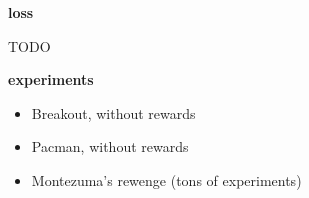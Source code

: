 \documentclass[xcolor=dvipsnames]{beamer}
\begin{document}
\begin{frame}{\bf loss}

TODO 

\end{frame}


\begin{frame}{\bf experiments}

  \begin{itemize}
    \item Breakout, without rewards
    \item Pacman, without rewards
    \item Montezuma's rewenge (tons of experiments)
  \end{itemize}

\end{frame}
\end{document}
